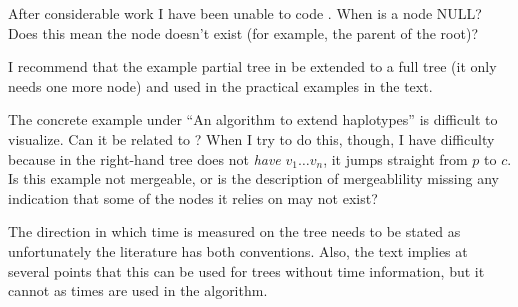 
\begin{point}{}
After considerable work I have been unable to code .
When is a node NULL? Does this mean the node doesn't exist (for
example, the parent of the root)?
\end{point}


\begin{point}{} %
I recommend that the example partial tree in  be
extended to a full tree (it only needs one more node) and used in
the practical examples in the text.
\end{point}


\begin{point}{} %
The concrete example under ``An algorithm to extend haplotypes'' is
difficult to visualize. Can it be related to ? When I try to
do this, though, I have difficulty because in  the right-hand
tree does not \emph{have} $v_1 \ldots v_n$, it jumps straight from $p$ to $c.$ Is
this example not mergeable, or is the description of mergeablility
missing any indication that some of the nodes it relies on may not
exist?
\end{point}


\begin{point}{} %
The direction in which time is measured on the tree needs to be stated
as unfortunately the literature has both conventions. Also, the text
implies at several points that this can be used for trees without
time information, but it cannot as times are used in the algorithm.
\end{point}

